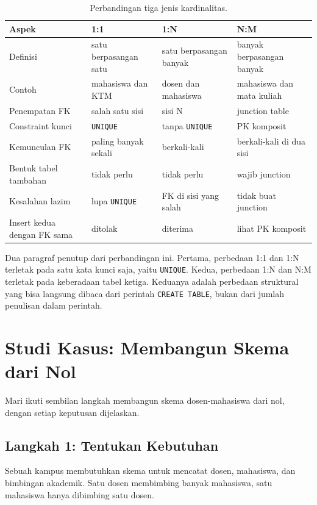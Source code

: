 \documentclass[11pt,a4paper]{article}
\begin{document}
\begin{table}[H]
	\centering
	\caption{Perbandingan tiga jenis kardinalitas.}
	\label{tab:comparison}
	\footnotesize
	\begin{tabularx}{\textwidth}{l X X X}
		\toprule
		Aspek & 1:1 & 1:N & N:M \\
		\midrule
		Definisi & satu berpasangan satu & satu berpasangan banyak & banyak berpasangan banyak \\
		Contoh & mahasiswa dan KTM & dosen dan mahasiswa & mahasiswa dan mata kuliah \\
		Penempatan FK & salah satu sisi & sisi N & junction table \\
		Constraint kunci & \texttt{UNIQUE} & tanpa \texttt{UNIQUE} & PK komposit \\
		Kemunculan FK & paling banyak sekali & berkali-kali & berkali-kali di dua sisi \\
		Bentuk tabel tambahan & tidak perlu & tidak perlu & wajib junction \\
		Kesalahan lazim & lupa \texttt{UNIQUE} & FK di sisi yang salah & tidak buat junction \\
		Insert kedua dengan FK sama & ditolak & diterima & lihat PK komposit \\
		\bottomrule
	\end{tabularx}
\end{table}

Dua paragraf penutup dari perbandingan ini. Pertama, perbedaan 1:1 dan 1:N terletak pada satu kata kunci saja, yaitu \texttt{UNIQUE}. Kedua, perbedaan 1:N dan N:M terletak pada keberadaan tabel ketiga. Keduanya adalah perbedaan struktural yang bisa langsung dibaca dari perintah \texttt{CREATE TABLE}, bukan dari jumlah penulisan dalam perintah.

\section{Studi Kasus: Membangun Skema dari Nol}

Mari ikuti sembilan langkah membangun skema dosen-mahasiswa dari nol, dengan setiap keputusan dijelaskan.

\subsection{Langkah 1: Tentukan Kebutuhan}

Sebuah kampus membutuhkan skema untuk mencatat dosen, mahasiswa, dan bimbingan akademik. Satu dosen membimbing banyak mahasiswa, satu mahasiswa hanya dibimbing satu dosen.
\end{document}

